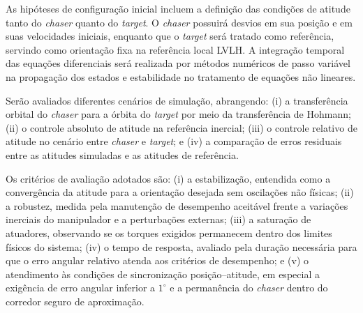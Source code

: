 As hipóteses de configuração inicial incluem a definição das condições de atitude tanto do \emph{chaser} quanto do \emph{target}.
O \emph{chaser} possuirá desvios em sua posição e em suas velocidades iniciais, enquanto que o \emph{target} será tratado como referência, servindo como orientação fixa na referência local LVLH.
A integração temporal das equações diferenciais será realizada por métodos numéricos de passo variável na propagação dos estados e estabilidade no tratamento de equações não lineares.  

Serão avaliados diferentes cenários de simulação, abrangendo:
(i) a transferência orbital do \emph{chaser} para a órbita do \emph{target} por meio da transferência de Hohmann;
(ii) o controle absoluto de atitude na referência inercial;
(iii) o controle relativo de atitude no cenário entre \emph{chaser} e \emph{target}; e
(iv) a comparação de erros residuais entre as atitudes simuladas e as atitudes de referência.

Os critérios de avaliação adotados são:
(i) a estabilização, entendida como a convergência da atitude para a orientação desejada sem oscilações não físicas;
(ii) a robustez, medida pela manutenção de desempenho aceitável frente a variações inerciais do manipulador e a perturbações externas;
(iii) a saturação de atuadores, observando se os torques exigidos permanecem dentro dos limites físicos do sistema;
(iv) o tempo de resposta, avaliado pela duração necessária para que o erro angular relativo atenda aos critérios de desempenho; e
(v) o atendimento às condições de sincronização posição--atitude, em especial a exigência de erro angular inferior a $1^\circ$ e a permanência do \emph{chaser} dentro do corredor seguro de aproximação.
